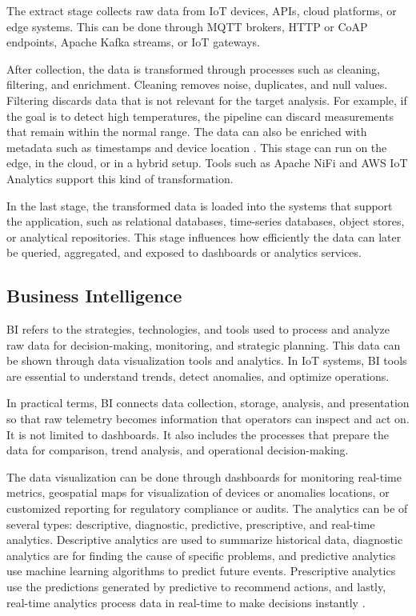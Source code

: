 The extract stage collects raw data from \gls{IoT} devices, \gls{API}s, cloud
platforms, or edge systems. This can be done through \gls{MQTT} brokers,
\gls{HTTP} or \gls{CoAP} endpoints, Apache Kafka streams, or \gls{IoT}
gateways.

After collection, the data is transformed through processes such as cleaning,
filtering, and enrichment. Cleaning removes noise, duplicates, and null
values. Filtering discards data that is not relevant for the target analysis.
For example, if the goal is to detect high temperatures, the pipeline can
discard measurements that remain within the normal range. The data can also be
enriched with metadata such as timestamps and device location
\cite{singu2022etl}. This stage can run on the edge, in the cloud, or in a
hybrid setup. Tools such as Apache NiFi and \gls{AWS} \gls{IoT} Analytics
support this kind of transformation.

In the last stage, the transformed data is loaded into the systems that
support the application, such as relational databases, time-series databases,
object stores, or analytical repositories. This stage influences how
efficiently the data can later be queried, aggregated, and exposed to
dashboards or analytics services.

\subsection{Business Intelligence}
\gls{BI} refers to the strategies, technologies, and tools used to process and
analyze raw data for decision-making, monitoring, and strategic planning.
This data can be shown through data visualization tools and analytics.
In \gls{IoT} systems, \gls{BI} tools are essential to understand trends, detect
anomalies, and optimize operations.

In practical terms, \gls{BI} connects data collection, storage, analysis, and
presentation so that raw telemetry becomes information that operators can
inspect and act on. It is not limited to dashboards. It also includes the
processes that prepare the data for comparison, trend analysis, and operational
decision-making.

The data visualization can be done through dashboards for monitoring real-time
metrics, geospatial maps for visualization of devices or anomalies locations,
or customized reporting for regulatory compliance or audits. The analytics can
be of several types: descriptive, diagnostic, predictive, prescriptive, and
real-time analytics. Descriptive analytics are used to summarize historical
data, diagnostic analytics are for finding the cause of specific problems, and
predictive analytics use machine learning algorithms to predict future events.
Prescriptive analytics use the predictions generated by predictive to recommend
actions, and lastly, real-time analytics process data in real-time to make
decisions instantly \cite{Adi2020}.

